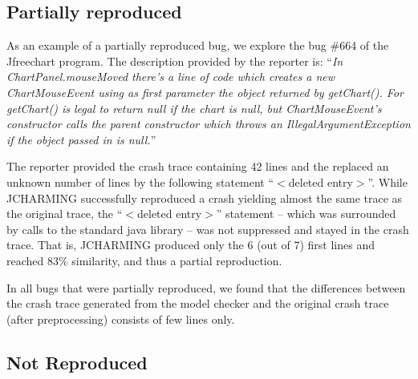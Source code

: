 \documentclass[times]{smrauth}
\begin{document}
\subsection{Partially reproduced}

As an example of a partially reproduced bug, we explore the
bug \#664 of the Jfreechart program. The description provided
by the reporter is: ``{\it In ChartPanel.mouseMoved there's a line
of code which creates a new ChartMouseEvent using as first
parameter the object returned by getChart(). For getChart() is
legal to return null if the chart is null, but ChartMouseEvent's
constructor calls the parent constructor which throws an
IllegalArgumentException if the object passed in is null.}''

The reporter provided the crash trace containing 42 lines and
the replaced an unknown number of lines by the following
statement ``$<$deleted entry$>$''. While JCHARMING successfully reproduced a crash yielding almost the same trace
as the original trace, the ``$<$deleted entry$>$'' statement -- which
was surrounded by calls to the standard java library -- was not
suppressed and stayed in the crash trace. That is,
JCHARMING produced only the 6 (out of 7) first lines and
reached 83\% similarity, and thus a partial reproduction.

\vspace*{0.3cm}

\noindent{}

\vspace*{0.3cm}

In all bugs that were partially reproduced, we found that the
differences between the crash trace generated from the model
checker and the original crash trace (after preprocessing)
consists of few lines only.

\subsection{Not Reproduced}
\end{document}
